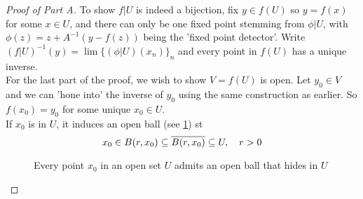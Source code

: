 \documentclass[../main-manifolds.tex]{subfiles}
\begin{document}
\begin{proof}[Proof of Part A]
    To show $f|U$ is indeed a bijection, fix $y\in f(U)$ so $y = f(x)$ for some $x\in U$, and there can only be one fixed point stemming from $\phi|U$, with $\phi(z) = z + A^{-1}(y-f(z))$ being the 'fixed point detector'. Write $(f|U)^{-1}(y) = \lim \{(\phi|U)(x_n)\}_n$ and every point in $f(U)$ has a unique inverse.\\

    For the last part of the proof, we wish to show $V = f(U)$ is open. Let $y_0\in V$ and we can 'hone into' the inverse of $y_0$ using the same construction as earlier. So $f(x_0) = y_0$ for some unique $x_0\in U$.\\
    
    If $x_0$ is in $U$, it induces an open ball (see \cref{rudin-chp9-open set induces ball that hides inside}) st
    \[
        x_0\in B(r,x_0)\subseteq \overline{B(r,x_0)}\subseteq U,\quad r>0
    \]

    \begin{figure}
        \centering
        \caption{Every point $x_0$ in an open set $U$ admits an open ball that hides in $U$}
        \label{rudin-chp9-open set induces ball that hides inside}
    \end{figure}


\end{proof}
\end{document}
